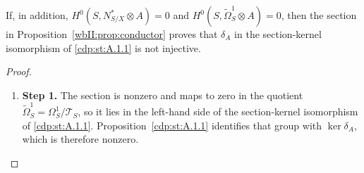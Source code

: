 \begin{corollary}
\hypertarget{tag-03DU}{}\label{wbII:cor:normal-crossing-kernel}

If, in addition, $H^0(S,N^*_{S/X}\otimes A)=0$ and
$H^0(S,\widetilde\Omega^1_S\otimes A)=0$, then the section in
Proposition~\ref{wbII:prop:conductor} proves that $\delta_A$ in
the section-kernel isomorphism of \cref{cdp:st:A.1.1} is not injective.
\end{corollary}



\begin{proof}
\begin{enumerate}[label={$\langle1\rangle$\arabic*.},leftmargin=*]
\item 
\noindent\textbf{Step 1.} The section is nonzero and maps to zero in the quotient
$\widetilde\Omega^1_S=\Omega^1_S/\mathscr T_S$, so it
lies in the left-hand side of the section-kernel isomorphism of \cref{cdp:st:A.1.1}.  Proposition~\ref{cdp:st:A.1.1}
identifies that group with $\ker\delta_A$, which is therefore nonzero.

\end{enumerate}
\end{proof}